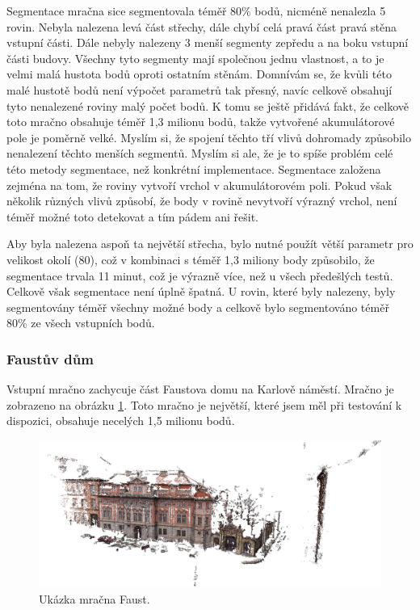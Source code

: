 \documentclass[11pt,twoside,a4paper]{book}
\begin{document}
Segmentace mračna sice segmentovala téměř 80\% bodů, nicméně nenalezla 5 rovin. Nebyla nalezena levá část střechy, dále chybí celá pravá část pravá stěna vstupní části. Dále nebyly nalezeny 3 menší segmenty zepředu a na boku vstupní části budovy. Všechny tyto segmenty mají společnou jednu vlastnost, a to je velmi malá hustota bodů oproti ostatním stěnám. Domnívám se, že kvůli této malé hustotě bodů není výpočet parametrů tak přesný, navíc celkově obsahují tyto nenalezené roviny malý počet bodů. K tomu se ještě přidává fakt, že celkově toto mračno obsahuje téměř 1,3 milionu bodů, takže vytvořené akumulátorové pole je poměrně velké. Myslím si, že spojení těchto tří vlivů dohromady způsobilo nenalezení těchto menších segmentů. Myslím si ale, že je to spíše problém celé této metody segmentace, než konkrétní implementace. Segmentace založena zejména na tom, že roviny vytvoří vrchol v akumulátorovém poli. Pokud však několik různých vlivů způsobí, že body v rovině nevytvoří výrazný vrchol, není téměř možné toto detekovat a tím pádem ani řešit.

Aby byla nalezena aspoň ta největší střecha, bylo nutné použít větší parametr pro velikost okolí (80), což v kombinaci s téměř 1,3 miliony body způsobilo, že segmentace trvala 11 minut, což je výrazně více, než u všech předešlých testů. Celkově však segmentace není úplně špatná. U rovin, které byly nalezeny, byly segmentovány téměř všechny možné body a celkově bylo segmentováno téměř 80\% ze všech vstupních bodů. 


\cleardoublepage
\subsubsection{Faustův dům}

Vstupní mračno zachycuje část Faustova domu na Karlově náměstí. Mračno je zobrazeno na obrázku \ref{fig:faust}. Toto mračno je největší, které jsem měl při testování k dispozici, obsahuje necelých 1,5 milionu bodů.

\begin{figure}[H]
\begin{center}
\includegraphics[width=\textwidth]{figures/faust}
\caption{Ukázka mračna Faust.}
\label{fig:faust}
\end{center}
\end{figure}
\end{document}
